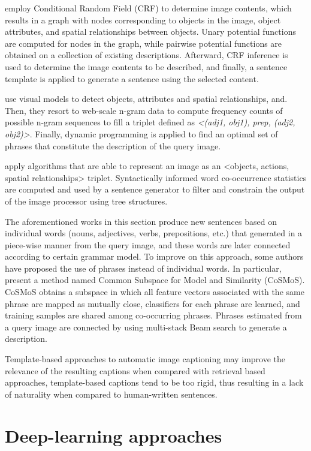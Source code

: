 \citet{Kulkarni2011} employ Conditional Random Field (CRF) to determine image contents, which results in a graph with nodes corresponding to objects in the image, object attributes, and spatial relationships between objects. Unary potential functions are computed for nodes in the graph, while pairwise potential functions are obtained on a collection of existing descriptions. Afterward, CRF inference is used to determine the image contents to be described, and finally, a sentence template is applied to generate a sentence using the selected content.

\citet{Li2011} use visual models to detect objects, attributes and spatial relationships, and. Then, they resort to web-scale n-gram data to compute frequency counts of possible n-gram sequences to fill a triplet defined as \textit{<(adj1, obj1), prep, (adj2, obj2)>}. Finally, dynamic programming is applied to find an optimal set of phrases that constitute the description of the query image.

\citet{Mitchell2012} apply algorithms that are able to represent an image as an <objects, actions, spatial relationships> triplet. Syntactically informed word co-occurrence statistics are computed and used by a sentence generator to filter and constrain the output of the image processor using tree structures.

The aforementioned works in this section produce new sentences based on individual words (nouns, adjectives, verbs, prepositions, etc.) that generated in a piece-wise manner from the query image, and these words are later connected according to certain grammar model. To improve on this approach, some authors have proposed the use of phrases instead of individual words. In particular, \citet{Ushiku2015} present a method named Common Subspace for Model and Similarity (CoSMoS). CoSMoS obtains a subspace in which all feature vectors associated with the same phrase are mapped as mutually close, classifiers for each phrase are learned, and training samples are shared among co-occurring phrases. Phrases estimated from a query image are connected by using multi-stack Beam search to generate a description.

Template-based approaches to automatic image captioning may improve the relevance of the resulting captions when compared with retrieval based approaches, template-based captions tend to be too rigid, thus resulting in a lack of naturality when compared to human-written sentences.

\section{Deep-learning approaches}\label{sec:deep-learning_methods}

